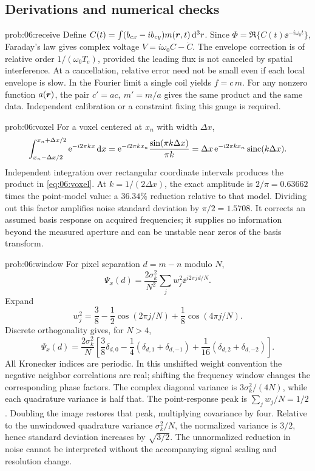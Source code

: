 \subsection{Derivations and numerical checks}
\begin{solution}{prob:06:receive}
Define \(C(t)=\int(b_{cx}-ib_{cy})m(\bm{r},t)\mathop{}\!\mathrm{d}^3r\).
Since \(\Phi=\Re\{C(t)\ee^{-i\omega_0t}\}\), Faraday's law gives complex voltage
\(V=i\omega_0C-\dot C\).
The envelope correction is of relative order \(1/(\omega_0T_e)\), provided the leading flux is not canceled by spatial interference.
At a cancellation, relative error need not be small even if each local envelope is slow.
In the Fourier limit a single coil yields \(f=c\,m\).
For any nonzero function \(a(\bm{r})\), the pair \(c'=ac,\ m'=m/a\) gives the same product and the same data. Independent calibration or a constraint fixing this gauge is required.
\end{solution}
\begin{solution}{prob:06:voxel}
For a voxel centered at \(x_n\) with width \(\Delta x\),
\[
 \int_{x_n-\Delta x/2}^{x_n+\Delta x/2}
 \mathrm{e}^{-i2\pi kx}\mathop{}\!\mathrm{d} x
 =\mathrm{e}^{-i2\pi kx_n}\frac{\sin(\pi k\Delta x)}{\pi k}
 =\Delta x\,\mathrm{e}^{-i2\pi kx_n}\operatorname{sinc}(k\Delta x).
\]
Independent integration over rectangular coordinate intervals produces the product in \cref{eq:06:voxel}.
At \(k=1/(2\Delta x)\), the exact amplitude is \(2/\pi=0.63662\) times the point-model value: a \(36.34\%\) reduction relative to that model.
Dividing out this factor amplifies noise standard deviation by \(\pi/2=1.5708\).
It corrects an assumed basis response on acquired frequencies; it supplies no information beyond the measured aperture and can be unstable near zeros of the basis transform.
\end{solution}
\begin{solution}{prob:06:window}
For pixel separation \(d=m-n\) modulo \(N\),
\[
 \Psi_x(d)=\frac{2\sigma_k^2}{N^2}
 \sum_j w_j^2\ee^{i2\pi jd/N}.
\]
Expand
\[
 w_j^2=\frac38-\frac12\cos(2\pi j/N)
                  +\frac18\cos(4\pi j/N).
\]
Discrete orthogonality gives, for \(N>4\),
\[
 \Psi_x(d)=\frac{2\sigma_k^2}{N}
 \left[\frac38\delta_{d,0}
 -\frac14(\delta_{d,1}+\delta_{d,-1})
 +\frac1{16}(\delta_{d,2}+\delta_{d,-2})\right].
\]
All Kronecker indices are periodic. In this unshifted weight convention the negative neighbor correlations are real; shifting the frequency window changes the corresponding phase factors.
The complex diagonal variance is \(3\sigma_k^2/(4N)\), while each quadrature variance is half that.
The point-response peak is \(\sum_jw_j/N=1/2\).
Doubling the image restores that peak, multiplying covariance by four. Relative to the unwindowed quadrature variance \(\sigma_k^2/N\), the normalized variance is \(3/2\), hence standard deviation increases by \(\sqrt{3/2}\).
The unnormalized reduction in noise cannot be interpreted without the accompanying signal scaling and resolution change.
\end{solution}
